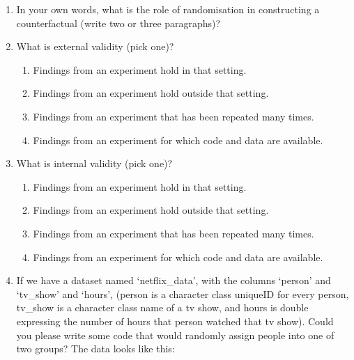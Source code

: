 \documentclass[
]{book}
\providecommand{\tightlist}{%
  \setlength{\itemsep}{0pt}\setlength{\parskip}{0pt}}
\begin{document}
\begin{enumerate}
\def\labelenumi{\arabic{enumi}.}
\tightlist
\item
  In your own words, what is the role of randomisation in constructing a counterfactual (write two or three paragraphs)?
\item
  What is external validity (pick one)?

  \begin{enumerate}
  \def\labelenumii{\alph{enumii}.}
  \tightlist
  \item
    Findings from an experiment hold in that setting.
  \item
    Findings from an experiment hold outside that setting.
  \item
    Findings from an experiment that has been repeated many times.
  \item
    Findings from an experiment for which code and data are available.
  \end{enumerate}
\item
  What is internal validity (pick one)?

  \begin{enumerate}
  \def\labelenumii{\alph{enumii}.}
  \tightlist
  \item
    Findings from an experiment hold in that setting.
  \item
    Findings from an experiment hold outside that setting.
  \item
    Findings from an experiment that has been repeated many times.
  \item
    Findings from an experiment for which code and data are available.
  \end{enumerate}
\item
  If we have a dataset named `netflix\_data', with the columns `person' and `tv\_show' and `hours', (person is a character class uniqueID for every person, tv\_show is a character class name of a tv show, and hours is double expressing the number of hours that person watched that tv show). Could you please write some code that would randomly assign people into one of two groups? The data looks like this:
\end{enumerate}
\end{document}
